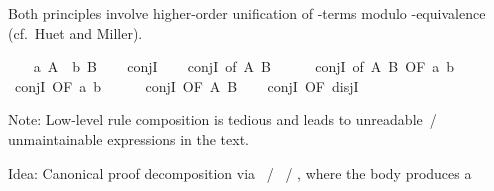 \begin{isabellebody}
\begin{isamarkuptext}
  Both principles involve higher-order unification of -terms
  modulo -equivalence (cf.\ Huet and Miller).%
\end{isamarkuptext}%
\isamarkuptrue%
\isamarkupfalse%
\isanewline
{}\isanewline
%
\isadelimproof
\ \ %
\endisadelimproof
%
\isatagproof
{}\isamarkupfalse%
\ a{}\ A\ \ b{}\ B%
\endisatagproof
{\isafoldproof}%
%
\isadelimproof
\isanewline
%
\endisadelimproof
\ \ \isamarkupfalse%
\ conjI\isanewline
\ \ \isamarkupfalse%
\ conjI\ {}of\ A\ B{}\ \ %
\isanewline
\ \ \isamarkupfalse%
\ conjI\ {}of\ A\ B{}\ OF\ a\ b{}\ \ %
\isanewline
\ \ \isamarkupfalse%
\ conjI\ {}OF\ a\ b{}\ \ %
\isanewline
\ \ \isamarkupfalse%
\ conjI\ {}OF\ {}A{}\ {}B{}{}\isanewline
\isanewline
\ \ \isamarkupfalse%
\ conjI\ {}OF\ disjI{}{}\isanewline
{}\isamarkupfalse%
%
\begin{isamarkuptext}%
Note: Low-level rule composition is tedious and leads to
  unreadable~/ unmaintainable expressions in the text.%
\end{isamarkuptext}%
\isamarkuptrue%
%
\isamarkuptrue%
%
\begin{isamarkuptext}%
Idea: Canonical proof decomposition via \hyperlink{command.fix}{\mbox{}}~/
  \hyperlink{command.assume}{\mbox{}}~/ \hyperlink{command.show}{\mbox{}}, where the body produces a

\end{isamarkuptext}
\end{isabellebody}
